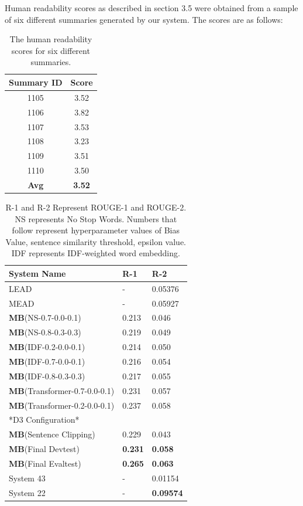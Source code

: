 \documentclass[11pt,a4paper]{article}
\begin{document}
Human readability scores as described in section 3.5 were obtained from a sample of six different summaries generated by our system. The scores are as follows:
\begin{table}[h]
    \centering
    
        \begin{tabular}{|c|c|}
        \hline
        \textbf{Summary ID} & \textbf{Score}\\
        \hline
         1105 & 3.52 \\
         \hline
         1106 & 3.82\\
         \hline
         1107 & 3.53\\
         \hline
         1108 & 3.23\\
         \hline
         1109 & 3.51\\
         \hline
         1110 & 3.50\\
         \hline
         \textbf{Avg} & \textbf{3.52}\\
         \hline
        \end{tabular}
    \label{table:1}
    \caption{The human readability scores for six different summaries.}
\end{table}

\begin{table}[h]
\begin{tabular}{|l|l|l|} \hline
\textbf{System Name} & \textbf{R-1} & \textbf{R-2}\\ \hline
LEAD & - & 0.05376 \\ \hline
MEAD & - & 0.05927 \\ \hline
\textbf{MB}(NS-0.7-0.0-0.1) & 0.213 & 0.046 \\ \hline
\textbf{MB}(NS-0.8-0.3-0.3) & 0.219 & 0.049 \\ \hline
\textbf{MB}(IDF-0.2-0.0-0.1) & 0.214  & 0.050 \\ \hline
\textbf{MB}(IDF-0.7-0.0-0.1) & 0.216  & 0.054 \\ \hline
\textbf{MB}(IDF-0.8-0.3-0.3) & 0.217  & 0.055 \\ \hline
\textbf{MB}(Transformer-0.7-0.0-0.1) & 0.231  & 0.057 \\ \hline
\textbf{MB}(Transformer-0.2-0.0-0.1) & 0.237  & 0.058 \\
*D3 Configuration* &  & \\  \hline
\textbf{MB}(Sentence Clipping) & 0.229 & 0.043\\ \hline
\textbf{MB}(Final Devtest) & \textbf{0.231} & \textbf{0.058}\\ \hline
\textbf{MB}(Final Evaltest) & \textbf{0.265} & \textbf{0.063}\\ \hline
System 43 & - & 0.01154\\ \hline
System 22 & - & \textbf{0.09574} \\ \hline
\end{tabular}
\label{table:1}
\caption{R-1 and R-2 Represent ROUGE-1 and ROUGE-2. NS represents No Stop Words. Numbers that follow represent hyperparameter values of Bias Value, sentence similarity threshold, epsilon value. IDF represents IDF-weighted word embedding.}
\end{table}
\end{document}
